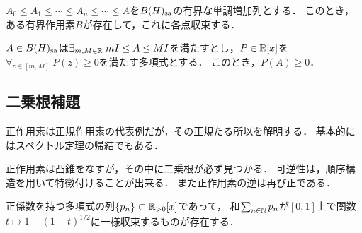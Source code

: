 \documentclass[uplatex,dvipdfmx]{jsreport}
\begin{document}
\begin{theorem}
    $A_0\le A_1\le\cdots\le A_n\le\cdots\le A$を$B(H)_{\mathrm{sa}}$の有界な単調増加列とする．
    このとき，ある有界作用素$B$が存在して，これに各点収束する．
\end{theorem}

\begin{proposition}
    $A\in B(H)_{\mathrm{sa}}$は$\exists_{m,M\in\mathbb{R}}\;m I\le A\le MI$を満たすとし，$P\in\mathbb{R}[x]$を$\forall_{z\in[m,M]}\;P(z)\ge0$を満たす多項式とする．
    このとき，$P(A)\ge0$．
\end{proposition}

\subsection{二乗根補題}

\begin{tcolorbox}[colframe=ForestGreen, colback=ForestGreen!10!white,breakable,colbacktitle=ForestGreen!40!white,coltitle=black,fonttitle=\bfseries\sffamily,
title=]
    正作用素は正規作用素の代表例だが，その正規たる所以を解明する．
    基本的にはスペクトル定理の帰結でもある．

    正作用素は凸錐をなすが，その中に二乗根が必ず見つかる．
    可逆性は，順序構造を用いて特徴付けることが出来る．
    また正作用素の逆は再び正である．
\end{tcolorbox}

\begin{lemma}
    正係数を持つ多項式の列$\{p_n\}\subset\mathbb{R}_{>0}[x]$であって，
    和$\sum_{n\in\mathbb{N}}p_n$が$[0,1]$上で関数$t\mapsto 1-(1-t)^{1/2}$に一様収束するものが存在する．
\end{lemma}
\end{document}
